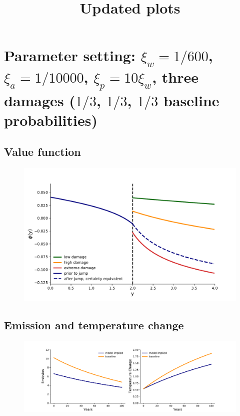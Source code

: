\documentclass[11pt]{article}
\title{Updated plots}
\begin{document}
\maketitle
 
\section{Parameter setting: $\xi_w=1/600$, $\xi_a=1/10000$, $\xi_p=10\xi_w$, three damages ($1/3$, $1/3$, $1/3$ baseline probabilities)}

\subsection{Value function}
\begin{figure}[H]
		\center
		\includegraphics[height=.35\textheight]{value.pdf}
\end{figure}

\subsection{Emission and temperature change}
\begin{figure}[H]
		\center
		\includegraphics[height=.25\textheight]{emission_temperature.pdf}
\end{figure}
\end{document}
